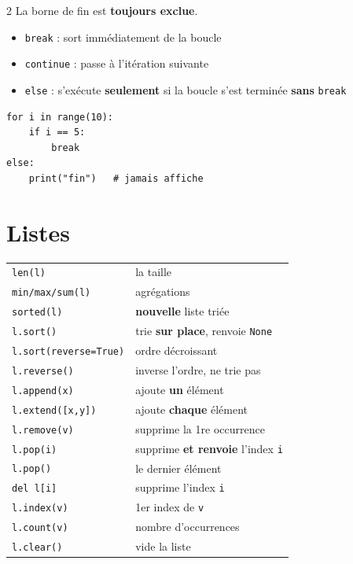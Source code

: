 \documentclass[a4paper,10pt]{article}
\newcommand{\co}[1]{\texttt{\textcolor{codefg}{#1}}}
\begin{document}
\begin{multicols}{2}
La borne de fin est \textbf{toujours exclue}.

\begin{itemize}
  \item \co{break} : sort immédiatement de la boucle
  \item \co{continue} : passe à l'itération suivante
  \item \co{else} : s'exécute \textbf{seulement} si la boucle s'est terminée
        \textbf{sans} \co{break}
\end{itemize}

\begin{lstlisting}
for i in range(10):
    if i == 5:
        break
else:
    print("fin")   # jamais affiche
\end{lstlisting}

\section{Listes}

\begin{tabularx}{\linewidth}{@{}l>{\raggedright\arraybackslash}X@{}}
\toprule
\co{len(l)} & la taille \\
\co{min/max/sum(l)} & agrégations \\
\co{sorted(l)} & \textbf{nouvelle} liste triée \\
\co{l.sort()} & trie \textbf{sur place}, renvoie \co{None} \\
\co{l.sort(reverse=True)} & ordre décroissant \\
\co{l.reverse()} & inverse l'ordre, ne trie pas \\
\co{l.append(x)} & ajoute \textbf{un} élément \\
\co{l.extend([x,y])} & ajoute \textbf{chaque} élément \\
\co{l.remove(v)} & supprime la 1re occurrence \\
\co{l.pop(i)} & supprime \textbf{et renvoie} l'index \co{i} \\
\co{l.pop()} & le dernier élément \\
\co{del l[i]} & supprime l'index \co{i} \\
\co{l.index(v)} & 1er index de \co{v} \\
\co{l.count(v)} & nombre d'occurrences \\
\co{l.clear()} & vide la liste \\
\bottomrule
\end{tabularx}


\end{multicols}
\end{document}
